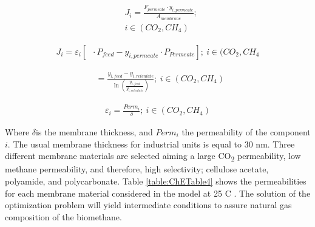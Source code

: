 \begin{refsection}[referencesCh7]
\begin{align}
&{J_i} = \frac{{{F_{permeate}}\cdot{y_{i,permeate}}}}{{{A_{membrane}}}}; \label{eq:ChEEq18} \\
&i \in (CO_{2},CH_{4}) \nonumber
\end{align}

\begin{align}
{J_i} = {\varepsilon _i}\left[ {\mathop {{y_{feedside}}}\limits^{} \cdot{P_{feed}} - {y_{i,permeate}}\cdot P{}_{Permeate}} \right]; \ i \in (CO_{2},CH_{4} \label{eq:ChEEq19}
\end{align}

\begin{align}
\mathop {{y_{feedside}}}\limits^{}  = \frac{{{y_{i,feed}} - {y_{i,retentate}}}}{{\ln \left( {\frac{{{y_{i,feed}}}}{{{y_{i,retentate}}}}} \right)}}; \ i \in (CO_{2},CH_{4}) \label{eq:ChEEq20}
\end{align}

\begin{align}
{\varepsilon _i} = \frac{{Perm_{i}}}{\delta }; \ i \in (CO_{2},CH_{4}) \label{eq:ChEEq21}
\end{align}

Where $\delta$is the membrane thickness, and ${Perm_{i}}$ the permeability of the component $i$. The usual membrane thickness for industrial units is equal to 30 nm. Three different membrane materials are selected aiming a large CO\textsubscript{2} permeability, low methane permeability, and therefore, high selectivity; cellulose acetate, polyamide, and polycarbonate. Table \ref{table:ChETable4} shows the permeabilities for each membrane material considered in the model at 25 \textdegree C \citep{vrbova2017upgrading}. The solution of the optimization problem will yield intermediate conditions to assure natural gas composition of the biomethane.

\begin{table}[h]
	\centering
	\caption{Gases permeability \protect\citet{vrbova2017upgrading}.}
	\label{table:ChETable4}
\end{table}


\end{refsection}
